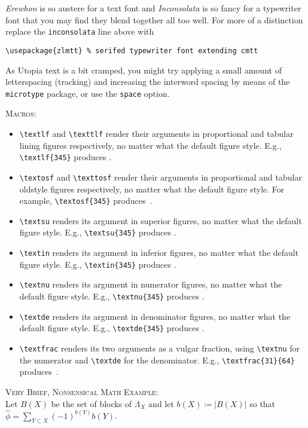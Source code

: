 \documentclass[11pt]{amsart}
\begin{document}
\emph{Erewhon} is so austere for a text font and \emph{Inconsolata} is so fancy for a typewriter font that you may find they blend together all too well. For more of a distinction replace the {\tt inconsolata} line above with
\begin{verbatim}
\usepackage{zlmtt} % serifed typewriter font extending cmtt
\end{verbatim}

As Utopia text is a bit cramped, you might try  applying a small amount of letterspacing (tracking) and increasing the interword spacing by means of the {\tt microtype} package, or use the {\tt space} option.

\textsc{Macros:}
\begin{itemize}
\item
\verb|\textlf| and \verb|\texttlf| render their arguments in proportional and tabular lining figures respectively, no matter what the default figure style. E.g., \verb|\textlf{345}| produces .
\item
\verb|\textosf| and \verb|\texttosf| render their arguments in proportional and tabular oldstyle figures respectively, no matter what the default figure style. For example, \verb|\textosf{345}| produces~.
\item
\verb|\textsu|  renders its argument in superior figures, no matter what the default figure style. E.g., \verb|\textsu{345}| produces .
\item
\verb|\textin|  renders its argument in inferior figures, no matter what the default figure style. E.g., \verb|\textin{345}| produces .
\item
\verb|\textnu|  renders its argument in numerator figures, no matter what the default figure style. E.g., \verb|\textnu{345}| produces .
\item
\verb|\textde|  renders its argument in denominator figures, no matter what the default figure style. E.g., \verb|\textde{345}| produces .
\item
\verb|\textfrac|  renders its two arguments as a vulgar fraction, using \verb|\textnu| for the numerator and \verb|\textde| for the denominator. E.g., \verb|\textfrac{31}{64}| produces~.
\end{itemize}
\textsc{Very Brief, Nonsensical Math Example:}\\
Let $B(X)$ be the set of blocks of $\Lambda_{X}$
and let $b(X) \coloneq |{B(X)}|$ so that $\hat\phi=\sum_{Y\subset X}(-1)^{b(Y)}b(Y)$. 
\end{document}
